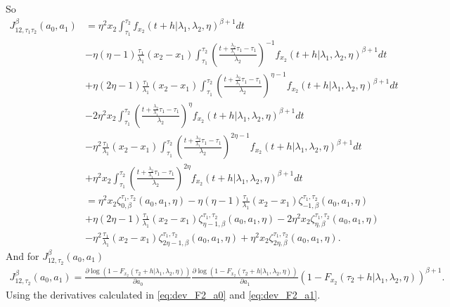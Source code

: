 \documentclass{article}
\begin{document}
So
\begin{align*}
J_{12,\tau_1\tau_2}^{\beta}(a_0,a_1)&=\eta^2x_2\int_{\tau_1}^{\tau_2}f_{x_2}(t+h|\lambda_1,\lambda_2,\eta)^{\beta+1}dt
\\
&-\eta(\eta-1)\frac{\tau_1}{\lambda_1}(x_2-x_1)\int_{\tau_1}^{\tau_2}\left(\frac{t+\frac{\lambda_2}{\lambda_1}\tau_1-\tau_1}{\lambda_2}\right)^{-1}f_{x_2}(t+h|\lambda_1,\lambda_2,\eta)^{\beta+1}dt
\\
&+\eta(2\eta-1)\frac{\tau_1}{\lambda_1}(x_2-x_1)\int_{\tau_1}^{\tau_2}\left(\frac{t+\frac{\lambda_2}{\lambda_1}\tau_1-\tau_1}{\lambda_2}\right)^{\eta-1}f_{x_2}(t+h|\lambda_1,\lambda_2,\eta)^{\beta+1}dt
\\
&-2\eta^2x_2\int_{\tau_1}^{\tau_2}\left(\frac{t+\frac{\lambda_2}{\lambda_1}\tau_1-\tau_1}{\lambda_2}\right)^{\eta}f_{x_2}(t+h|\lambda_1,\lambda_2,\eta)^{\beta+1}dt
\\
&-\eta^2\frac{\tau_1}{\lambda_1}(x_2-x_1)\int_{\tau_1}^{\tau_2}\left(\frac{t+\frac{\lambda_2}{\lambda_1}\tau_1-\tau_1}{\lambda_2}\right)^{2\eta-1}f_{x_2}(t+h|\lambda_1,\lambda_2,\eta)^{\beta+1}dt
\\
&+\eta^2x_2\int_{\tau_1}^{\tau_2}\left(\frac{t+\frac{\lambda_2}{\lambda_1}\tau_1-\tau_1}{\lambda_2}\right)^{2\eta}f_{x_2}(t+h|\lambda_1,\lambda_2,\eta)^{\beta+1}dt
\\
&=\eta^2x_2\zeta_{0,\beta}^{\tau_1,\tau_2}(a_0,a_1,\eta)
-\eta(\eta-1)\frac{\tau_1}{\lambda_1}(x_2-x_1)\zeta_{-1,\beta}^{\tau_1,\tau_2}(a_0,a_1,\eta)
\\
&+\eta(2\eta-1)\frac{\tau_1}{\lambda_1}(x_2-x_1)\zeta_{\eta-1,\beta}^{\tau_1,\tau_2}(a_0,a_1,\eta)
-2\eta^2x_2\zeta_{\eta,\beta}^{\tau_1,\tau_2}(a_0,a_1,\eta)
\\
&-\eta^2\frac{\tau_1}{\lambda_1}(x_2-x_1)\zeta_{2\eta-1,\beta}^{\tau_1,\tau_2}(a_0,a_1,\eta)
+\eta^2x_2\zeta_{2\eta,\beta}^{\tau_1,\tau_2}(a_0,a_1,\eta).
\end{align*}
And for $J_{12,\tau_2}^{\beta}(a_0,a_1)$
\begin{align*}
J_{12,\tau_2}^{\beta}(a_0,a_1)=\frac{\partial \log\left(1-F_{x_2}(\tau_2+h|\lambda_1,\lambda_2,\eta)\right)}{\partial a_0}\frac{\partial \log\left(1-F_{x_2}(\tau_2+h|\lambda_1,\lambda_2,\eta)\right)}{\partial a_1}\left(1-F_{x_2}(\tau_2+h|\lambda_1,\lambda_2,\eta)\right)^{\beta+1}.
\end{align*}
Using the derivatives calculated in \eqref{eq:dev_F2_a0} and \eqref{eq:dev_F2_a1}.
\end{document}
